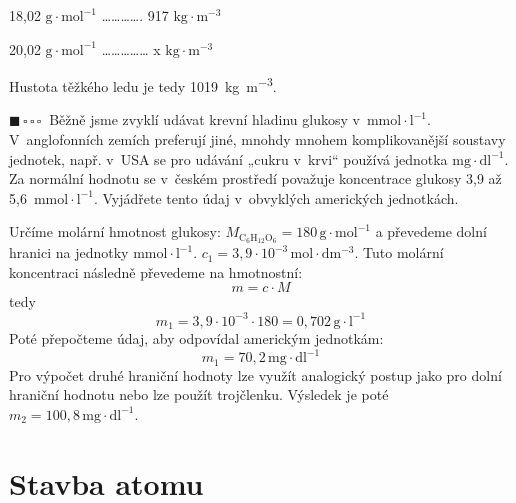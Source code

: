 \documentclass{book}
\newcommand{\jeden}{$\blacksquare \, \square \, \square \, \square \; \; $}
\renewenvironment{quotation}{\par}{\par} %
\begin{document}
18,02  $\mathrm{g\cdot mol^{-1}}$ …………. 917 $\mathrm{kg\cdot m^{-3}}$ 

20,02 $\mathrm{g\cdot mol^{-1}}$ …………… x  $\mathrm{kg\cdot m^{-3}}$ 

\smallskip{}
Hustota těžkého ledu je tedy \SI[inter-unit-product =\ensuremath{{}\cdot{}}]{1019}{\kg\per\cubic\metre}.
\newpage %

\begin{quotation}
\jeden Běžně jsme zvyklí udávat krevní hladinu glukosy v~$\mathrm{mmol\cdot l^{-1}}$. V~anglofonních
zemích preferují jiné, mnohdy mnohem komplikovanější soustavy jednotek,
např. v~USA se pro udávání „cukru v~krvi“ používá jednotka $\mathrm{mg\cdot dl^{-1}}$.
Za normální hodnotu se v~českém prostředí považuje koncentrace glukosy
3,9 až 5,6~$\mathrm{mmol\cdot l^{-1}}$. Vyjádřete tento údaj v~obvyklých amerických jednotkách. 
\end{quotation} \dotfill \par 
Určíme molární hmotnost glukosy: $M_{\mathrm{C_{6}H_{12}O_{6}}}=180\,\mathrm{g\cdot mol^{-1}}$
a převedeme dolní hranici na jednotky $\mathrm{mmol\cdot l^{-1}}$. $c_{1}=3,9\cdot10^{-3}\,\mathrm{mol\cdot dm^{-3}}$.
Tuto molární koncentraci následně převedeme na hmotnostní:
\[
m=c\cdot M
\]
tedy
\[
m_{1}=3,9\cdot10^{-3}\cdot180=0,702\,\mathrm{g\cdot l^{-1}}
\]
Poté přepočteme údaj, aby odpovídal americkým jednotkám: 
\[
m_{1}=70,2\,\mathrm{mg\cdot dl^{-1}}
\]
Pro výpočet druhé hraniční hodnoty lze využít analogický postup jako
pro dolní hraniční hodnotu nebo lze použít trojčlenku. Výsledek je poté $m_{2}=100,8\,\mathrm{mg\cdot dl^{-1}}$.

\section{Stavba atomu}
\end{document}
